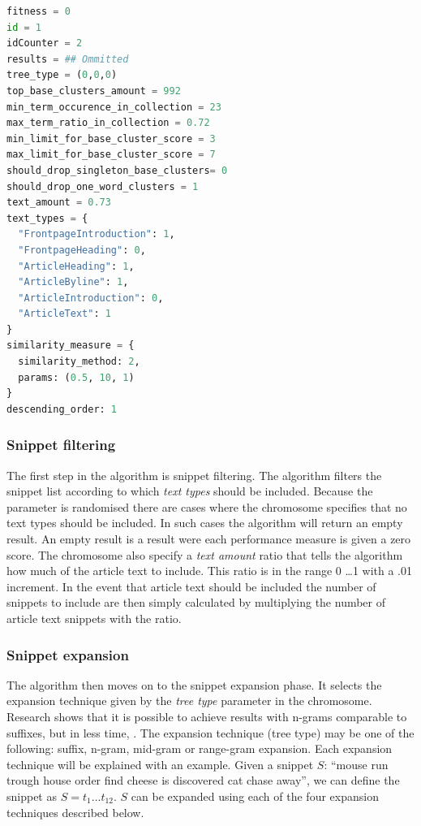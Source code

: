 \begin{lstlisting}[float=ht!, language=python, label=lst:chromosome, caption={An example chromosome}]
fitness = 0
id = 1
idCounter = 2
results = ## Ommitted
tree_type = (0,0,0)
top_base_clusters_amount = 992
min_term_occurence_in_collection = 23
max_term_ratio_in_collection = 0.72
min_limit_for_base_cluster_score = 3
max_limit_for_base_cluster_score = 7
should_drop_singleton_base_clusters= 0
should_drop_one_word_clusters = 1
text_amount = 0.73
text_types = {
  "FrontpageIntroduction": 1,
  "FrontpageHeading": 0,
  "ArticleHeading": 1,
  "ArticleByline": 1,
  "ArticleIntroduction": 0,
  "ArticleText": 1
}
similarity_measure = {
  similarity_method: 2,
  params: (0.5, 10, 1)
}
descending_order: 1
\end{lstlisting}

\subsubsection{Snippet filtering}
\label{subsubsec:snippetfiltering}
The first step in the \CTC algorithm is snippet filtering. The algorithm filters the snippet list according to which \emph{text types} should be included. Because the parameter is randomised there are cases where the chromosome specifies that no text types should be included. In such cases the algorithm will return an empty result. An empty result is a result were each performance measure is given a zero score. The chromosome also specify a \emph{text amount} ratio that tells the algorithm how much of the article text to include. This ratio is in the range 0 \dots 1 with a .01 increment. In the event that article text should be included the number of snippets to include are then simply calculated by multiplying the number of article text snippets with the ratio.

\subsubsection{Snippet expansion}
\label{subsubsec:snippetexpansion}
The algorithm then moves on to the snippet expansion phase. It selects the expansion technique given by the \emph{tree type} parameter in the chromosome. Research shows that it is possible to achieve results with n-grams comparable to suffixes, but in less time, \parencite{Moe2014compact}. The expansion technique (tree type) may be one of the following: suffix, n-gram, mid-gram or range-gram expansion. Each expansion technique will be explained with an example. Given a snippet \(S\): ``mouse run trough house order find cheese is discovered cat chase away'', we can define the snippet as \(S = t_{1} \dots t_{12}\). \(S\) can be expanded using each of the four expansion techniques described below.

